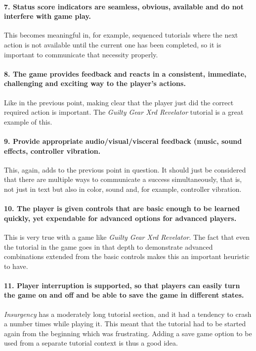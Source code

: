 \paragraph{7. Status score indicators are seamless, obvious, available and do not interfere with game play.}
This becomes meaningful in, for example, sequenced tutorials where the next action is not available until the current one has been completed, so it is important to communicate that necessity properly.

\paragraph{8. The game provides feedback and reacts in a consistent, immediate, challenging and exciting way to the player's actions.} Like in the previous point, making clear that the player just did the correct required action is important. The \textit{Guilty Gear Xrd Revelator} tutorial is a great example of this.

\paragraph{9. Provide appropriate audio/visual/visceral feedback (music, sound effects, controller vibration.} This, again, adds to the previous point in question. It should just be considered that there are multiple ways to communicate a success simultaneously, that is, not just in text but also in color, sound and, for example, controller vibration.

\paragraph{10. The player is given controls that are basic enough to be learned quickly, yet expendable for advanced options for advanced players.} This is very true with a game like \textit{Guilty Gear Xrd Revelator}. The fact that even the tutorial in the game goes in that depth to demonstrate advanced combinations extended from the basic controls makes this an important heuristic to have.

\paragraph{11. Player interruption is supported, so that players can easily turn the game on and off and be able to save the game in different states.} \textit{Insurgency} has a moderately long tutorial section, and it had a tendency to crash a number times while playing it. This meant that the tutorial had to be started again from the beginning which was frustrating. Adding a save game option to be used from a separate tutorial context is thus a good idea.

